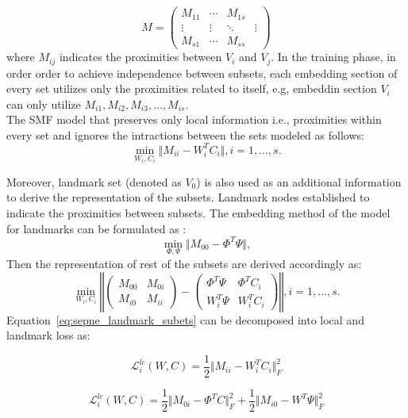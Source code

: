 \begin{itemize}
\[M=\begin{pmatrix}
M_{11} &\cdots &M_{1s} \\
\vdots & \vdots & \ddots & \vdots\\
M_{s1} &\cdots &M_{ss}
\end{pmatrix}\]
where $M_{ij}$ indicates the proximities between $V_i$ and $V_j$.  In the training phase, in order order to achieve independence between subsets, each embedding section of every set utilizes only the proximities related to itself, e.g, embeddin section $V_i$ can only utilize $M_{i1}, M_{i2}, M_{i3},..., M_{is}$. \\
The SMF model that preserves only local information i.e., proximities within every set and ignores the intractions between the sets modeled as follows:
\begin{equation}\label{eq:node2vec_objective_final}
\min_{W_i, C_i} \Vert M_{ii} - W_{i}^T C_i\Vert , i=1,..., s.
\end{equation}

Moreover, landmark set (denoted as $V_0$) is also used as an additional information to derive the representation of the subsets. Landmark nodes established to indicate the proximities between subsets. The embedding method of the model for landmarks can be formulated as :
\begin{equation}
\min_{\Phi, \Psi} \Vert M_{00} - \Phi^T \Psi \Vert ,
\end{equation}
Then the representation of rest of the subsets are derived accordingly as:
\begin{equation}\label{eq:sepne_landmark_subets}
\min_{W_i, C_i} \left\Vert 
\begin{pmatrix}
M_{00}  &M_{0i} \\
M_{i0} &M_{ii}
\end{pmatrix} - 
\begin{pmatrix}
\Phi^T \Psi & \Phi^T C_{i} \\
W_{i}^T \Psi & W_{i}^T C_{i}
\end{pmatrix} \right\Vert , i=1,..., s.
\end{equation}
Equation~\ref{eq:sepne_landmark_subets} can be decomposed into local and landmark loss as: 

\begin{equation}
\mathcal{L}_{i}^{lc}(W,C)=\frac{1}{2}\Vert M_{ii} - W_{i}^T C_i\Vert_{F}^2 
\end{equation}

\begin{equation}
\mathcal{L}_{i}^{lc}(W,C)=\frac{1}{2}\Vert M_{0i} - \Phi^T C\Vert_{F}^2 +\frac{1}{2}\Vert M_{i0} - W^T \Psi\Vert_{F}^2 
\end{equation}


\end{itemize}
